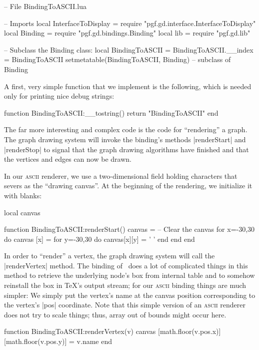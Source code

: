\begin{codeexample}
-- File BindingToASCII.lua

-- Imports
local InterfaceToDisplay = require "pgf.gd.interface.InterfaceToDisplay"
local Binding = require "pgf.gd.bindings.Binding"
local lib = require "pgf.gd.lib"

-- Subclass the Binding class:
local BindingToASCII = {}
BindingToASCII.__index = BindingToASCII
setmetatable(BindingToASCII, Binding) -- subclass of Binding
\end{codeexample}

A first, very simple function that we implement is the following,
which is needed only for printing nice debug strings:

\begin{codeexample}
function BindingToASCII:__tostring()
  return "BindingToASCII"
end
\end{codeexample}

The far more interesting and complex code is the code for
``rendering'' a graph. The graph drawing system will invoke the
binding's methods |renderStart| and |renderStop| to signal that the
graph drawing algorithms have finished and that the vertices and edges
can now be drawn.

In our \textsc{ascii} renderer, we use a two-dimensional field holding 
characters that severs as the ``drawing canvas''. At the beginning of
the rendering, we initialize it with blanks:

\begin{codeexample}
local canvas
  
function BindingToASCII:renderStart()
  canvas = {}
  -- Clear the canvas
  for x=-30,30 do
    canvas [x] = {}
    for y=-30,30 do
      canvas[x][y] = ' '
    end
  end
end
\end{codeexample}

In order to ``render'' a vertex, the graph drawing system will call
the |renderVertex| method. The binding of \tikzname\ does a lot of
complicated things in this method to retrieve the underlying node's
box from internal table and to somehow reinstall the box in \TeX's
output stream; for our \textsc{ascii} binding things are much simpler:
We simply put the vertex's name at the canvas position corresponding
to the vertex's |pos| coordinate. Note that this simple version of an
\textsc{ascii} renderer does not try to scale things; thus, array out
of bounds might occur here.

\begin{codeexample}
function BindingToASCII:renderVertex(v)
  canvas [math.floor(v.pos.x)][math.floor(v.pos.y)] = v.name
end
\end{codeexample}

